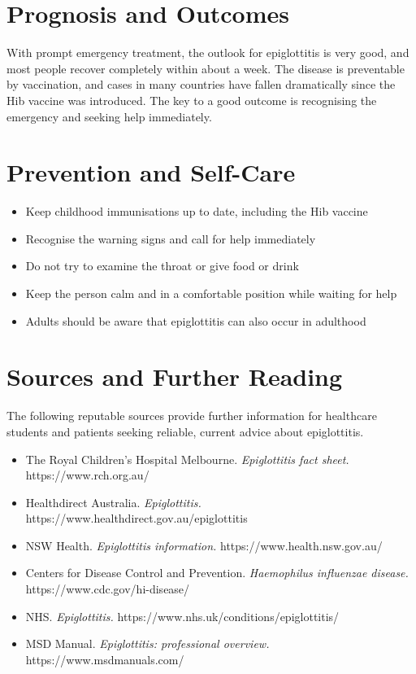 \section*{Prognosis and Outcomes}
With prompt emergency treatment, the outlook for epiglottitis is very good, and most people recover completely within about a week. The disease is preventable by vaccination, and cases in many countries have fallen dramatically since the Hib vaccine was introduced. The key to a good outcome is recognising the emergency and seeking help immediately.

\section*{Prevention and Self-Care}
\begin{itemize}
    \item Keep childhood immunisations up to date, including the Hib vaccine
    \item Recognise the warning signs and call for help immediately
    \item Do not try to examine the throat or give food or drink
    \item Keep the person calm and in a comfortable position while waiting for help
    \item Adults should be aware that epiglottitis can also occur in adulthood
\end{itemize}

\section*{Sources and Further Reading}
The following reputable sources provide further information for healthcare students and patients seeking reliable, current advice about epiglottitis.
\begin{itemize}
    \item The Royal Children's Hospital Melbourne. \textit{Epiglottitis fact sheet.} https://www.rch.org.au/
    \item Healthdirect Australia. \textit{Epiglottitis.} https://www.healthdirect.gov.au/epiglottitis
    \item NSW Health. \textit{Epiglottitis information.} https://www.health.nsw.gov.au/
    \item Centers for Disease Control and Prevention. \textit{Haemophilus influenzae disease.} https://www.cdc.gov/hi-disease/
    \item NHS. \textit{Epiglottitis.} https://www.nhs.uk/conditions/epiglottitis/
    \item MSD Manual. \textit{Epiglottitis: professional overview.} https://www.msdmanuals.com/
\end{itemize}
